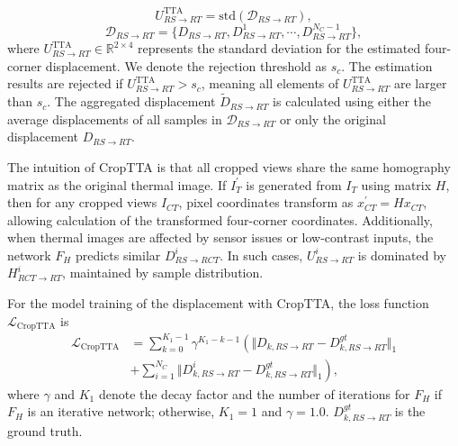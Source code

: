 \begin{equation}
    U^\textrm{TTA}_{RS\rightarrow RT} = \textrm{std}(\mathcal{D}_{RS\rightarrow RT}),
\end{equation}
\begin{equation}
\mathcal{D}_{RS\rightarrow RT} = \{D_{RS\rightarrow RT}, D^1_{RS\rightarrow RT},\cdots,D^{N_C-1}_{RS\rightarrow RT}\},
\end{equation} 
where $U^\textrm{TTA}_{RS\rightarrow RT}\in \mathbb{R}^{2\times4}$ represents the standard deviation for the estimated four-corner displacement. We denote the rejection threshold as $s_c$. The estimation results are rejected if $U^\textrm{TTA}_{RS\rightarrow RT} > s_c$, meaning all elements of $U^\textrm{TTA}_{RS\rightarrow RT}$ are larger than $s_c$. The aggregated displacement $\tilde D_{RS\rightarrow RT}$ is calculated using either the average displacements of all samples in $\mathcal{D}_{RS\rightarrow RT}$ or only the original displacement $D_{RS\rightarrow RT}$.

The intuition of CropTTA is that all cropped views share the same homography matrix as the original thermal image. If $I^\prime_T$ is generated from $I_T$ using matrix $H$, then for any cropped views $I_{CT}$, pixel coordinates transform as $x^\prime_{CT} = Hx_{CT}$, allowing calculation of the transformed four-corner coordinates. Additionally, when thermal images are affected by sensor issues or low-contrast inputs, the network $F_H$ predicts similar $D^i_{RS\rightarrow RCT}$. In such cases, $U^i_{RS\rightarrow RT}$ is dominated by $H^i_{RCT\rightarrow RT}$, maintained by sample distribution.

For the model training of the displacement with CropTTA, the loss function $\mathcal{L}_\textrm{CropTTA}$ is
\begin{equation}
\begin{split}
    \mathcal{L}_\textrm{CropTTA} &= \sum_{k=0}^{K_1-1}\gamma^{K_1 -k-1} \left( \Vert D_{k,RS \rightarrow RT} - D^{gt}_{k,RS \rightarrow RT}\Vert_1 \right.\\ & \left. + \sum_{i=1}^{N_C}\Vert D^i_{k,RS \rightarrow RT} -  D^{gt}_{k,RS \rightarrow RT}\Vert_1 \right),
\end{split}
\end{equation}
where $\gamma$ and $K_1$ denote the decay factor and the number of iterations for $F_H$ if $F_H$ is an iterative network; otherwise, $K_1 = 1$ and $\gamma=1.0$. $D^{gt}_{k,RS \rightarrow RT}$ is the ground truth.

